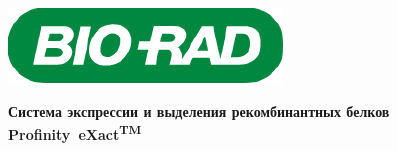 \newpage
\thispagestyle{empty}


\noindent\begin{minipage}[t]{0.29\textwidth}
	\vspace{0pt}
    \includegraphics[width=\textwidth]{images/biorad_color.pdf}
\end{minipage}
\hfill
\begin{minipage}[t]{0.65\textwidth}
	\vspace{0pt}\raggedright
	\noindent\textbf{\Large{Система экспрессии и выделения рекомбинантных белков \mbox{Profinity eXact\textsuperscript{TM}}}}
\end{minipage}

\bigskip

\bigskip

